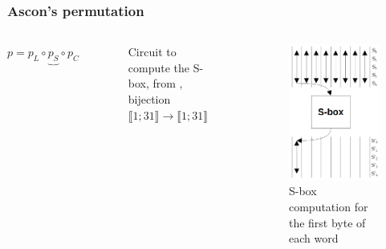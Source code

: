 \documentclass{beamer}
\begin{document}
	\begin{frame}
		\frametitle{Ascon's permutation}
		
		\begin{columns}
			$p = p_L \circ \underbrace{p_S}{} \circ p_C$\\
			\begin{figure}
				\resizebox*{150pt}{90pt}{
					
				}
				\caption{Circuit to compute the S-box, from \protect \footnotemark, bijection $\llbracket1;31 \rrbracket \rightarrow \llbracket 1;31 \rrbracket$}
				\label{circuit_sbox}
			\end{figure}
			
			\begin{figure}[h]
				\centering
				\includegraphics[width=0.6\linewidth]{img_files/sbox_illustration}
				\caption{S-box computation for the first byte of each word}
				\label{fig:comp}
			\end{figure}
			

		\end{columns}
	\end{frame}
	
\end{document}
